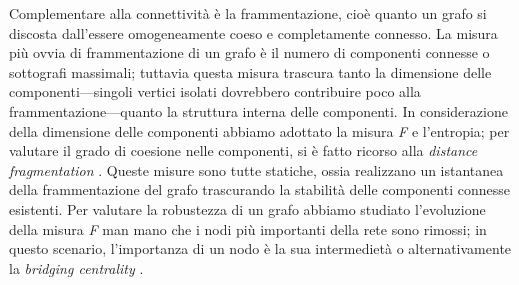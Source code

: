 Complementare alla connettivit\`a \`e la frammentazione, cio\`e quanto un grafo si discosta dall'essere omogeneamente coeso e completamente connesso. La misura pi\`u ovvia di frammentazione di un grafo \`e il numero di componenti connesse o sottografi massimali; tuttavia questa misura trascura tanto la dimensione delle componenti---singoli vertici isolati dovrebbero contribuire poco alla frammentazione---quanto la struttura interna delle componenti. In considerazione della dimensione delle componenti abbiamo adottato la misura \textit{F} \cite{borgatti_2002} e l'entropia; per valutare il grado di coesione nelle componenti, si \`e fatto ricorso alla \textit{distance fragmentation} \cite{borgatti_2002}. Queste misure sono tutte statiche, ossia realizzano un istantanea della frammentazione del grafo trascurando la stabilit\`a delle componenti connesse esistenti. Per valutare la robustezza di un grafo abbiamo studiato l'evoluzione della misura \textit{F} man mano che i nodi pi\`u importanti della rete sono rimossi; in questo scenario, l'importanza di un nodo \`e la sua intermediet\`a o alternativamente la \textit{bridging centrality} \cite{Hwang_2008}.

